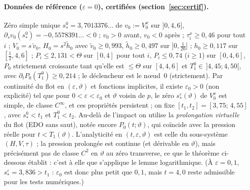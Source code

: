 \documentclass[11pt,a4paper]{article}
\theoremstyle{remark}
\newcommand{\vth}{\vartheta}
\begin{document}
\paragraph{Données de référence ($\varepsilon=0$), certifiées (section~\ref{sec:certif}).} Zéro simple unique $s_*^0=3{,}7013376\ldots$ de $v_0:=V_{0}^x$ sur $]0,4{,}6]$, $\partial_sv_0(s_*^0)=-0{,}5578391\ldots<0$ ; $v_0>0$ avant, $v_0<0$ après ; $\tau_i^x\ge0{,}46$ pour tout $i$ ; $V_0=s\,\tilde v_0$, $H_0=s^2\tilde h_0$ avec $\tilde v_0\ge0{,}993$, $\tilde h_0\ge0{,}497$ sur $]0,\frac1{20}]$ ; $h_0\ge0{,}117$ sur $[\frac12,4{,}6]$ ; $P_i\le2{,}131<\Theta$ sur $[0,4]$ pour tout $i$, $P_i\le0{,}74$ ($i\ge1$) sur $[0,4{,}6]$, $P_0$ strictement croissante tant qu'elle est $\le\Theta$ sur $[4,4{,}6]$ et $T_1^0\in\,]4{,}45;4{,}50[$, avec $\partial_tP_0(T_1^0)\ge0{,}214$ ; le déclencheur est le nœud~0 (strictement). Par continuité du flot en $(\varepsilon,\vth)$ et fonctions implicites, il existe $\varepsilon_0>0$ (non explicité) tel que pour $0<\varepsilon<\varepsilon_0$ et $\vth$ voisin de $p$, le zéro $s_*^\varepsilon(\vth)$ de $V_0^x$ est simple, de classe $C^\infty$, et ces propriétés persistent ; on fixe $[t_1,t_2]=[3{,}75;\,4{,}55]$, avec $s_*^0<t_1$ et $T_1^0<t_2$. Au-delà de l'impact on utilise la \emph{prolongation virtuelle} du flot (EDO sans saut), notée encore $P_0(t;\vth)$, qui coïncide avec la pression réelle pour $t<T_1(\vth)$. L'analyticité en $(t,\varepsilon,\vth)$ est celle du sous-système $(H,V,\tau)$ ; la pression prolongée est continue (et dérivable en $\vth$), mais précisément pas de classe $C^2$ en $\vth$ au zéro transverse, ce que le théorème ci-dessous établit : c'est à elle que s'applique le lemme logarithmique. (À $\varepsilon=0{,}1$, $s_*^\varepsilon=3{,}836>t_1$ : $\varepsilon_0$ est donc plus petit que $0{,}1$, mais $t=4{,}0$ reste admissible pour les tests numériques.)
\end{document}
